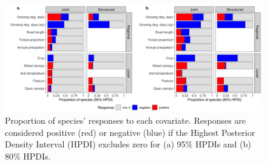 \documentclass[preprint,review,times,12pt]{elsarticle}
\begin{document}
\begin{figure}
	\centering\includegraphics[width=6.5in]{ms/1_Ecography/1/figs/b_opt_bar.png}
	\caption{\label{fig:b_bars} Proportion of species' responses to each covariate. Responses are considered positive (red) or negative (blue) if the Highest Posterior Density Interval (HPDI) excludes zero for (a) 95\% HPDIs and (b) 80\% HPDIs. }
\end{figure}
\end{document}
